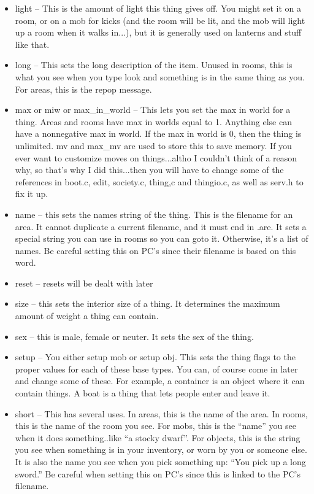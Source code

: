 \begin{itemize}
\item light -- This is the amount of light this thing gives off. You might set it on a room, or on a mob for kicks (and the room will be lit, and the mob will light up a room when it walks in...), but it is generally used on lanterns and stuff like that. 

\item long -- This sets the long description of the item. Unused in rooms, this is what you see when you type look and something is in the same thing as you. For areas, this is the repop message.

\item max or miw or max\_in\_world -- This lets you set the max in world for a thing. Areas and rooms have max in worlds equal to 1. Anything else can have a nonnegative max in world. If the max in world is 0, then the thing is unlimited. mv and max\_mv are used to store this to save memory. If you ever want to customize moves on things...altho I couldn't think of a reason why, so that's why I did this...then you will have to change some of the references in boot.c, edit, society.c, thing,c and thingio.c, as well as serv.h to fix it up.

\item name -- this sets the names string of the thing. This is the filename for an area. It cannot duplicate a current filename, and it must end in .are. It sets a special string you can use in rooms so you can goto it. Otherwise, it's a list of names. Be careful setting this on PC's since their filename is based on this word. 

\item reset -- resets will be dealt with later

\item size -- this sets the interior size of a thing. It determines the maximum amount of weight a thing can contain.

\item sex -- this is male, female or neuter. It sets the sex of the thing.

\item setup -- You either setup mob or setup obj. This sets the thing flags to the proper values for each of these base types. You can, of course come in later and change some of these. For example, a container is an object where it can contain things. A boat is a thing that lets people enter and leave it.

\item short -- This has several uses. In areas, this is the name of the area. In rooms, this is the name of the room you see. For mobs, this is the ``name'' you see when it does something..like ``a stocky dwarf''. For objects, this is the string you see when something is in your inventory, or worn by you or someone else. It is also the name you see when you pick something up: ``You pick up a long sword.'' Be careful when setting this on PC's since this is linked to the PC's filename.


\end{itemize}
